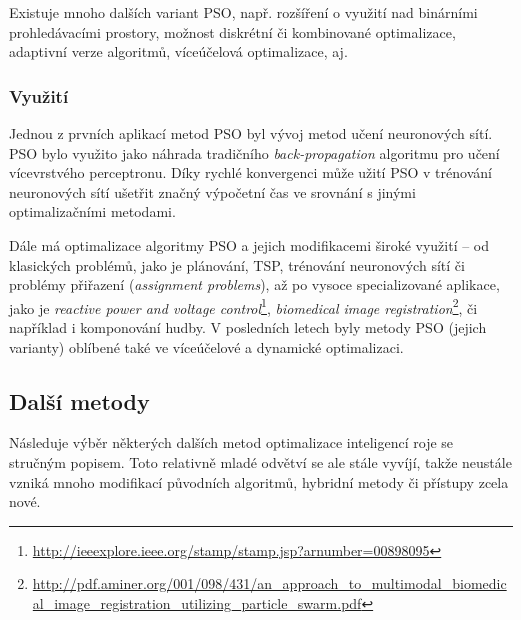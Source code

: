 \documentclass[a4paper,12pt]{article}
\begin{document}
\medskip

Existuje mnoho dalších variant PSO, např. rozšíření o využití nad binárními prohledávacími prostory, možnost
diskrétní či kombinované optimalizace, adaptivní verze algoritmů, víceúčelová optimalizace, aj.


\subsubsection{Využití}
Jednou z prvních aplikací metod PSO byl vývoj metod učení neuronových sítí. PSO bylo využito jako náhrada
tradičního {\it back-propagation} algoritmu pro učení vícevrstvého perceptronu. Díky rychlé konvergenci může
užití PSO v trénování neuronových sítí ušetřit značný výpočetní čas ve srovnání s jinými
optimalizačními metodami.

Dále má optimalizace algoritmy PSO a jejich modifikacemi široké využití -- od klasických problémů,
jako je plánování, TSP,
trénování neuronových sítí či problémy přiřazení ({\it assignment problems}), až po vysoce
specializované aplikace, jako je {\it reactive power and voltage
control}\footnote{\url{http://ieeexplore.ieee.org/stamp/stamp.jsp?arnumber=00898095}},
{\it biomedical image registration}\footnote{\url{http://pdf.aminer.org/001/098/431/an_approach_to_multimodal_biomedical_image_registration_utilizing_particle_swarm.pdf}},
či například i komponování hudby. V posledních letech byly metody PSO (jejich varianty) oblíbené také ve víceúčelové
a dynamické optimalizaci.

\subsection{Další metody}
Následuje výběr některých dalších metod optimalizace inteligencí roje se stručným popisem. Toto relativně mladé
odvětví se ale stále vyvíjí, takže neustále vzniká mnoho modifikací původních algoritmů, hybridní metody či
přístupy zcela nové.
\end{document}
